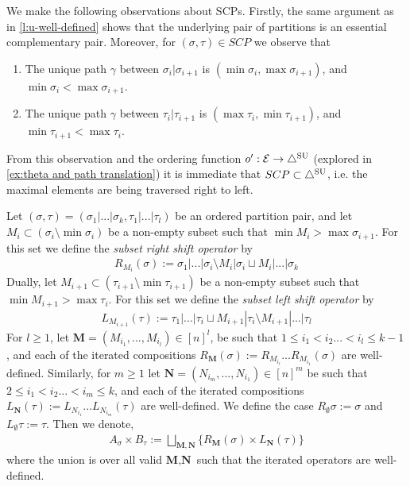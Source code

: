 We make the following observations about SCPs. Firstly, the same argument as in \cref{l:u-well-defined} shows that the underlying pair of partitions is an essential complementary pair.
Moreover, for $(\sigma,\tau)\in SCP$ we observe that 
\begin{enumerate}
    \item The unique path $\gamma$ between $\sigma_i|\sigma_{i+1}$ is $( \min \sigma_i, \max \sigma_{i+1} )$, and $\min \sigma_i< \max \sigma_{i+1}$.
    \item The unique path $\gamma$ between $\tau_i|\tau_{i+1}$ is $( \max \tau_i, \min \tau_{i+1} )$, and $\min \tau_{i+1}< \max \tau_{i}$.
\end{enumerate}
From this observation and the ordering function $o':\mathcal{E}\to \triangle^{\mathrm{SU}}$ (explored in \cref{ex:theta and path translation}) it is immediate that $SCP\subset\triangle^{\mathrm{SU}}$, i.e. the maximal elements are being traversed right to left.

\begin{definition} \label{def:subset shifts}
Let $(\sigma,\tau) = (\sigma_1|...|\sigma_k,\tau_1|...|\tau_l)$ be an ordered partition pair, and let $M_i\subset (\sigma_{i}\setminus \min \sigma_{i})$ be a non-empty subset such that $\min M_i> \max \sigma_{i+1}$. For this set we define the \emph{subset right shift operator} by
\begin{align*}
    R_{M_i}(\sigma):= \sigma_1|...|\sigma_i \setminus M_i|\sigma_i \sqcup M_i|...|\sigma_k
\end{align*}
Dually, let $M_{i+1}\subset (\tau_{i+1}\setminus \min \tau_{i+1})$  be a non-empty subset such that $\min M_{i+1}> \max \tau_{i}$. For this set we define the \emph{subset left shift operator} by
\begin{align*}
    L_{M_{i+1}}(\tau):= \tau_1|...|\tau_i \sqcup M_{i+1}|\tau_i \setminus M_{i+1}|...|\tau_l
\end{align*}
For $l\geq 1$, let $\textbf{M} = (M_{i_1},...,M_{i_l}) \in [n]^{l}$, be such that $1\leq i_1 < i_2 ... < i_l\leq k-1$, and each of the iterated compositions $R_\mathbf{M}(\sigma) := R_{M_{i_l}}...R_{M_{i_1}}(\sigma)$ are well-defined.
Similarly, for $m\geq 1$ let $\textbf{N} = (N_{i_m},...,N_{i_1}) \in [n]^{m}$ be such that $2\leq i_1 < i_2 ... < i_m\leq k$, and each of the iterated compositions  $L_\mathbf{N}(\tau) := L_{N_{i_1}}...L_{N_{i_m}}(\tau)$ are well-defined. We define the case $R_{\emptyset}\sigma := \sigma$ and $L_{\emptyset}\tau := \tau$. Then we denote,
\begin{align*}
    A_{\sigma}\times B_\tau:= \bigsqcup_{\mathbf{M},\mathbf{N}} \{R_\mathbf{M}(\sigma)\times L_\mathbf{N}(\tau) \}
\end{align*}
where the union is over all valid $\textbf{M},\textbf{N}$ such that the iterated operators are well-defined.
\end{definition}

